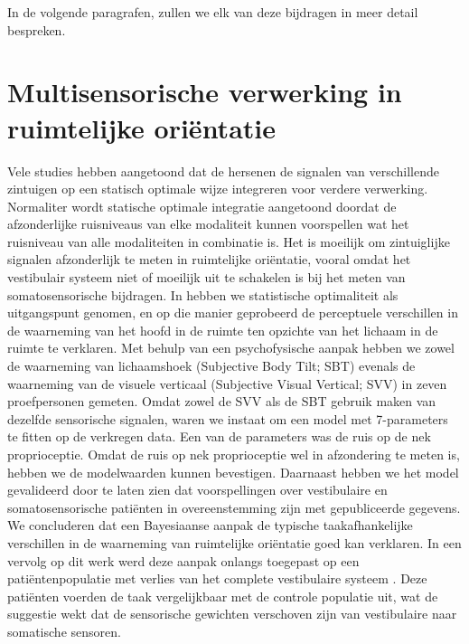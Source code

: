 In de volgende paragrafen, zullen we elk van deze bijdragen in meer detail bespreken.

\section{Multisensorische verwerking in ruimtelijke ori\"entatie}
Vele studies hebben aangetoond dat de hersenen de signalen van verschillende zintuigen op een statisch optimale wijze integreren voor verdere verwerking. Normaliter wordt statische optimale integratie aangetoond doordat de afzonderlijke ruisniveaus van elke modaliteit kunnen voorspellen wat het ruisniveau van alle modaliteiten in combinatie is. Het is moeilijk om zintuiglijke signalen afzonderlijk te meten in ruimtelijke oriëntatie, vooral omdat het vestibulair systeem niet of moeilijk uit te schakelen is bij het meten van somatosensorische bijdragen.
In  hebben we statistische optimaliteit als uitgangspunt genomen, en op die manier geprobeerd de perceptuele verschillen in de waarneming van het hoofd in de ruimte ten opzichte van het lichaam in de ruimte te verklaren. Met behulp van een psychofysische aanpak hebben we zowel de waarneming van lichaamshoek (Subjective Body Tilt; SBT) evenals de waarneming van de visuele verticaal (Subjective Visual Vertical; SVV) in zeven proefpersonen gemeten. Omdat zowel de SVV als de SBT gebruik maken van dezelfde sensorische signalen, waren we instaat om een model met 7-parameters te fitten op de verkregen data. Een van de parameters was de ruis op de nek proprioceptie. Omdat de ruis op nek proprioceptie wel in afzondering te meten is, hebben we de modelwaarden kunnen bevestigen. Daarnaast hebben we het model gevalideerd door te laten zien dat voorspellingen over vestibulaire en somatosensorische pati\"enten in overeenstemming zijn met gepubliceerde gegevens. We concluderen dat een Bayesiaanse aanpak de typische taakafhankelijke verschillen in de waarneming van ruimtelijke ori\"entatie goed kan verklaren. In een vervolg op dit werk werd deze aanpak onlangs toegepast op een pati\"entenpopulatie met verlies van het complete vestibulaire systeem \cite{alberts2015}. Deze pati\"enten voerden de taak vergelijkbaar met de controle populatie uit, wat de suggestie wekt dat de sensorische gewichten verschoven zijn van vestibulaire naar somatische sensoren.


